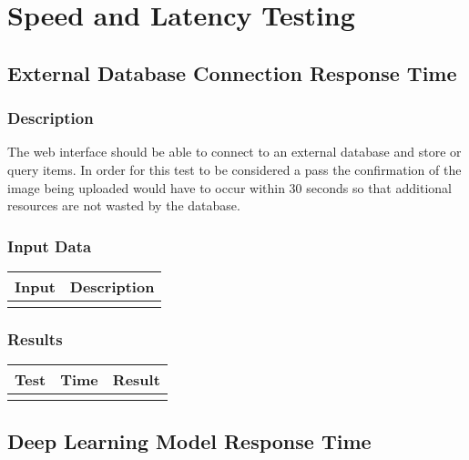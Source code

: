 \documentclass{scrreprt}
\begin{document}
\section{Speed and Latency Testing}

\subsection{External Database Connection Response Time}
\subsubsection{Description}
\begin{flushleft}
The web interface should be able to connect to an external database and store or query items. In order for this test to be considered a pass the confirmation of the image being uploaded would have to occur within 30 seconds so that additional resources are not wasted by the database.
\subsubsection{Input Data}
 \centering
 \begin{tabular}{p{3cm}p{6cm}}
 \hline\hline
 Input & Description\\
 \hline\hline
   &  \\ %
 \hline
 \end{tabular}
\subsubsection{Results}
\end{flushleft}
 \centering
 \begin{tabular}{||p{1.5cm}|p{1.5cm}|p{1.5cm}||}
 \hline
 \textbf Test & \textbf Time & \textbf Result \\
 \hline\hline
   &  & \\ %
 \hline
 \end{tabular}
 \begin{flushleft}  \newline \end{flushleft}

\subsection{Deep Learning Model Response Time}
\end{document}
